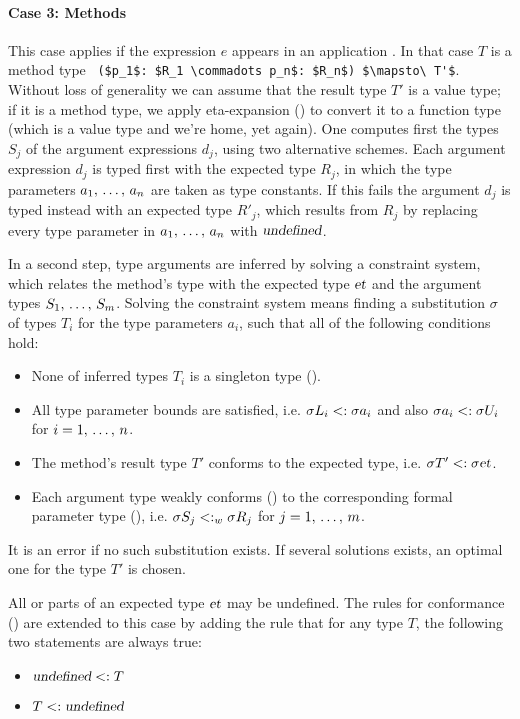 \paragraph{Case 3: Methods}
This case applies if the expression $e$ appears in an application . In that case $T$ is a method type ~\lstinline!($p_1$: $R_1 \commadots p_n$: $R_n$) $\mapsto\ T'$!. Without loss of generality we can assume that the result type $T'$ is a value type; if it is a method type, we apply eta-expansion () to convert it to a function type (which is a value type and we're home, yet again). One computes first the types $S_j$ of the argument expressions $d_j$, using two alternative schemes. Each argument expression $d_j$ is typed first with the expected type $R_j$, in which the type parameters $a_1 ,\, \ldots ,\, a_n$ are taken as type constants. If this fails the argument $d_j$ is typed instead with an expected type $R'_j$, which results from $R_j$ by replacing every type parameter in $a_1 ,\, \ldots ,\, a_n$ with $\mbox{\sl undefined}$. 

In a second step, type arguments are inferred by solving a constraint system, which relates the method's type with the expected type $\mbox{\sl et}$ and the argument types $S_1 ,\, \ldots ,\, S_m$. Solving the constraint system means finding a substitution $\sigma$ of types $T_i$ for the type parameters $a_i$, such that all of the following conditions hold:
\begin{itemize}
\item None of inferred types $T_i$ is a singleton type (). %
\item All type parameter bounds are satisfied, i.e. $\sigma L_i <: \sigma a_i$ and also $\sigma a_i <: \sigma U_i$ for $i = 1 ,\, \ldots ,\, n$. 
\item The method's result type $T'$ conforms to the expected type, i.e. $\sigma T' <: \sigma \mbox{\sl et}$. 
\item Each argument type weakly conforms () to the corresponding formal parameter type (), i.e. $\sigma S_j <: _w \sigma R_j$ for $j = 1 ,\, \ldots ,\, m$. 
\end{itemize}

It is an error if no such substitution exists. If several solutions exists, an optimal one for the type $T'$ is chosen. 

All or parts of an expected type $\mbox{\sl et}$ may be undefined. The rules for conformance () are extended to this case by adding the rule that for any type $T$, the following two statements are always true:
\begin{itemize}
\item $\mbox{\sl undefined} <: T$
\item $T <: \mbox{\sl undefined}$
\end{itemize}

